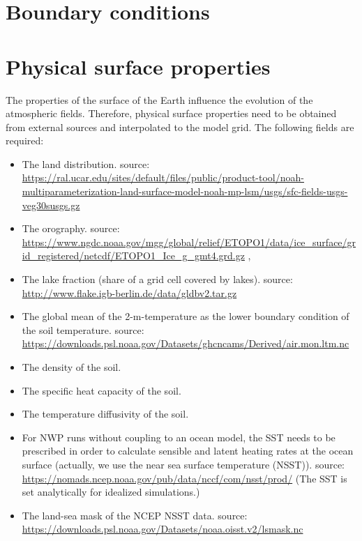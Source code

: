 \documentclass[10pt]{report}
\begin{document}
\chapter{Boundary conditions}
\label{chap:boundary_conditions}

\chapter{Physical surface properties}
\label{sec:physical_surface_properties}

The properties of the surface of the Earth influence the evolution of the atmospheric fields. Therefore, physical surface properties need to be obtained from external sources and interpolated to the model grid. The following fields are required:
%
\begin{itemize}
\item The land distribution. source: \url{https://ral.ucar.edu/sites/default/files/public/product-tool/noah-multiparameterization-land-surface-model-noah-mp-lsm/usgs/sfc-fields-usgs-veg30susgs.gz} \cite{glcc}
\item The orography. source: \url{https://www.ngdc.noaa.gov/mgg/global/relief/ETOPO1/data/ice_surface/grid_registered/netcdf/ETOPO1_Ice_g_gmt4.grd.gz} \cite{etopo1}, \cite{etopo1_add}
\item The lake fraction (share of a grid cell covered by lakes). source: \url{http://www.flake.igb-berlin.de/data/gldbv2.tar.gz} \cite{gldb}
\item The global mean of the 2-m-temperature as the lower boundary condition of the soil temperature. source: \url{https://downloads.psl.noaa.gov/Datasets/ghcncams/Derived/air.mon.ltm.nc} \cite{GHCN_CAMS}
\item The density of the soil.
\item The specific heat capacity of the soil.
\item The temperature diffusivity of the soil.
\item For NWP runs without coupling to an ocean model, the SST needs to be prescribed in order to calculate sensible and latent heating rates at the ocean surface (actually, we use the near sea surface temperature (NSST)). source: \url{https://nomads.ncep.noaa.gov/pub/data/nccf/com/nsst/prod/} (The SST is set analytically for idealized simulations.)
\item The land-sea mask of the NCEP NSST data. source: \url{https://downloads.psl.noaa.gov/Datasets/noaa.oisst.v2/lsmask.nc}
\end{itemize}

\appendix

\printbibliography
\end{document}

